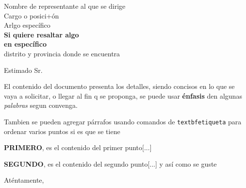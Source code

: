 \documentclass[11pt, a4paper]{letter} %
\begin{document}

\begin{letter}{
	Nombre de representante al que se dirige\\
	Cargo o posici+ón\\
	Arlgo específico \\
	\textbf{Si quiere resaltar algo} \\
	\textbf{en específico}\\
	distrito y provincia donde se encuentra
}


\opening{Estimado Sr. }

El contenido del documento presenta los detalles, siendo concisos en lo que se vaya a solicitar, o llegar al fin q se proponga, se puede usar \textbf{énfasis} den algunas \textit{palabras} segun convenga. 

Tambien se pueden agregar párrafos usando comandos de \texttt{textbf{etiqueta}} para ordenar varios puntos si es que se tiene

\textbf{PRIMERO}, es el contenido del primer punto[...] 

\textbf{SEGUNDO}, es el contenido del segundo punto[...] y así como se guste

\closing{Aténtamente,}




\end{letter}
\end{document}

